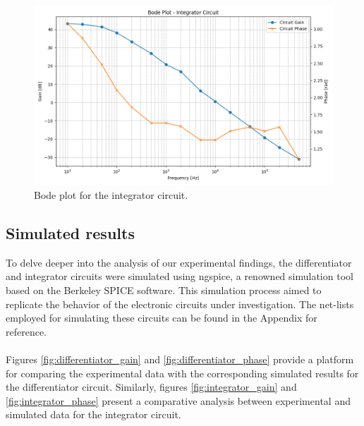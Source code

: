 		\begin{figure}[H]
		    \centering
		    \includegraphics[width=1\textwidth]{figures/integrator/bode_plot.png}
		    \caption{Bode plot for the integrator circuit.}
		    \label{fig:integrator_bode}
		\end{figure}
	


	\subsection{Simulated results}
	   
		To delve deeper into the analysis of our experimental findings, the differentiator and integrator circuits were simulated using ngspice, a renowned simulation tool based on the Berkeley SPICE software. 
		This simulation process aimed to replicate the behavior of the electronic circuits under investigation. 
		The net-lists employed for simulating these circuits can be found in the Appendix for reference. \\\\
		Figures \ref{fig:differentiator_gain} and \ref{fig:differentiator_phase} provide a platform for comparing the experimental data with the corresponding simulated results for the differentiator circuit.
		Similarly, figures \ref{fig:integrator_gain} and \ref{fig:integrator_phase} present a comparative analysis between experimental and simulated data for the integrator circuit. \\
		

